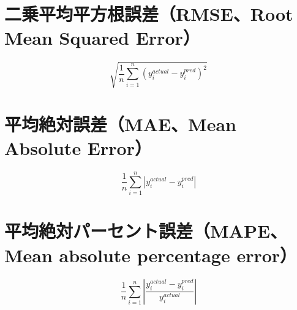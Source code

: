 \documentclass[a4paper,11pt]{jsarticle}
\begin{document}
\section*{二乗平均平方根誤差（RMSE、Root Mean Squared Error）}  
\begin{equation}  
\sqrt{\frac{1}{n}\sum_{i=1}^n(y_i^{actual} - y_i^{pred})^2}  
\end{equation}  

\section*{平均絶対誤差（MAE、Mean Absolute Error）}  
\begin{equation}  
\frac{1}{n}\sum_{i=1}^n|y_i^{actual} - y_i^{pred}|  
\end{equation}  

\section*{平均絶対パーセント誤差（MAPE、Mean absolute percentage error）}  
\begin{equation}  
\frac{1}{n}\sum_{i=1}^n|\frac{y_i^{actual} - y_i^{pred}}{y_i^{actual}}|  
\end{equation}  
\end{document}
